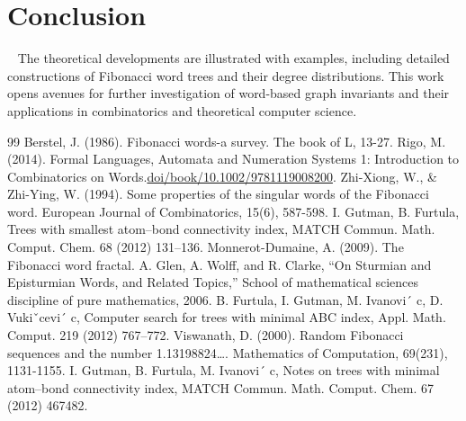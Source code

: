 \documentclass[12pt, a4paper]{article}
\begin{document}
\section{Conclusion}~\label{sec5}
The theoretical developments are illustrated with examples, including detailed constructions of Fibonacci word trees and their degree distributions. This work opens avenues for further investigation of word-based graph invariants and their applications in combinatorics and theoretical computer science.
\begin{thebibliography}{99}
 Berstel, J. (1986). Fibonacci words-a survey. The book of L, 13-27.
\medskip
 Rigo, M. (2014). Formal Languages, Automata and Numeration Systems 1: Introduction to Combinatorics on Words.\url{doi/book/10.1002/9781119008200}.
\medskip
 Zhi-Xiong, W., \& Zhi-Ying, W. (1994). Some properties of the singular words of the Fibonacci word. European Journal of Combinatorics, 15(6), 587-598.
\medskip
 I. Gutman, B. Furtula, Trees with smallest atom–bond connectivity index, MATCH Commun. Math. Comput. Chem. 68 (2012) 131–136.
\medskip
 Monnerot-Dumaine, A. (2009). The Fibonacci word fractal.
\medskip
A. Glen, A. Wolff, and R. Clarke, “On Sturmian and Episturmian Words, and Related Topics,” School of mathematical sciences discipline of pure mathematics, 2006.
\medskip
 B. Furtula, I. Gutman, M. Ivanovi´ c, D. Vukiˇcevi´ c, Computer search for trees with minimal ABC index, Appl. Math. Comput. 219 (2012) 767–772.
\medskip
 Viswanath, D. (2000). Random Fibonacci sequences and the number 1.13198824…. Mathematics of Computation, 69(231), 1131-1155.
\medskip
 I. Gutman, B. Furtula, M. Ivanovi´ c, Notes on trees with minimal atom–bond connectivity index, MATCH Commun. Math. Comput. Chem. 67 (2012) 467482.

\end{thebibliography}
\end{document}
